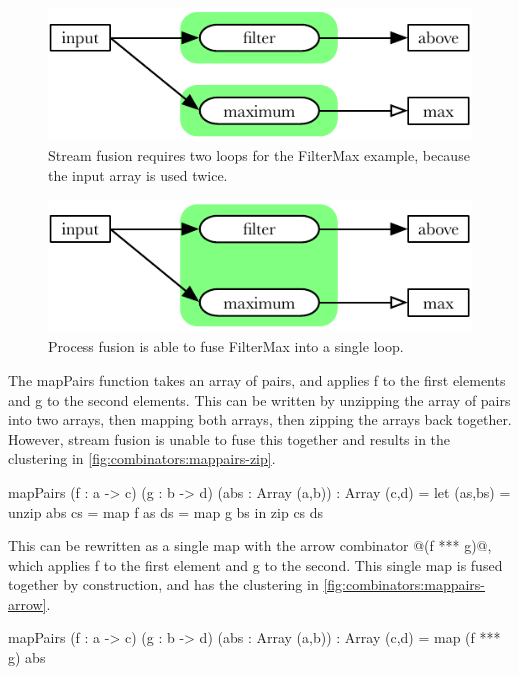 \begin{figure}
\center
\includegraphics{figs/combinators/filtermax-stream.pdf}
\caption{Stream fusion requires two loops for the FilterMax example, because the input array is used twice.}
\label{fig:combinators:filtermax-stream}
\end{figure}

\begin{figure}
\center
\includegraphics{figs/combinators/filtermax-fused.pdf}
\caption{Process fusion is able to fuse FilterMax into a single loop.}
\label{fig:combinators:filtermax-fused}
\end{figure}

The mapPairs function takes an array of pairs, and applies f to the first elements and g to the second elements.
This can be written by unzipping the array of pairs into two arrays, then mapping both arrays, then zipping the arrays back together.
However, stream fusion is unable to fuse this together and results in the clustering in \autoref{fig:combinators:mappairs-zip}.

\begin{code}
mapPairs (f : a -> c) (g : b -> d) (abs : Array (a,b)) : Array (c,d)
 = let (as,bs) = unzip abs
        cs     = map f as
        ds     = map g bs
   in  zip cs ds
\end{code}

This can be rewritten as a single map with the arrow combinator @(f *** g)@, which applies f to the first element and g to the second.
This single map is fused together by construction, and has the clustering in \autoref{fig:combinators:mappairs-arrow}.

\begin{code}
mapPairs (f : a -> c) (g : b -> d) (abs : Array (a,b)) : Array (c,d)
 = map (f *** g) abs
\end{code}

